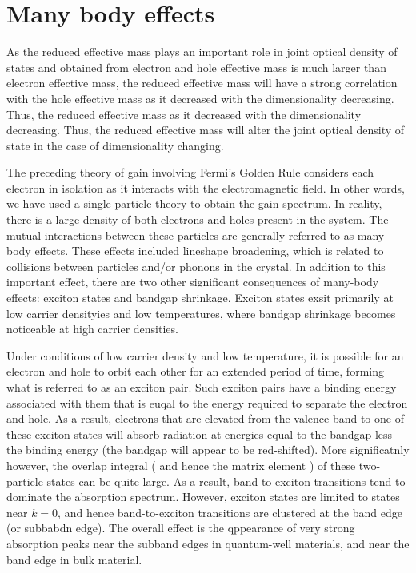 \section{Many body effects}

As the reduced effective mass plays an important role in joint optical density
of states and obtained from electron and hole effective mass is much larger
than electron effective mass, the reduced effective mass will have a strong
correlation with the hole effective mass as it decreased with the
dimensionality decreasing. Thus, the reduced effective mass as it decreased
with the dimensionality decreasing. Thus, the reduced effective mass will alter
the joint optical density of state in the case of dimensionality changing.

The preceding theory of gain involving Fermi's Golden Rule considers each
electron in isolation as it interacts with the electromagnetic field. In other
words, we have used a single-particle theory to obtain the gain spectrum. In
reality, there is a large density of both electrons and holes present in the
system. The mutual interactions between these particles are generally referred
to as many-body effects. These effects included lineshape broadening, which is
related to collisions between particles and/or phonons in the crystal. In
addition to this important effect, there are two other significant consequences
of many-body effects: exciton states and bandgap shrinkage. Exciton states
exsit primarily at low carrier densityies and low temperatures, where bandgap
shrinkage becomes noticeable at high carrier densities.

Under conditions of low carrier density and low temperature, it is possible for
an electron and hole to orbit each other for an extended period of time,
forming what is referred to as an exciton pair. Such exciton pairs have a
binding energy associated with them that is euqal to the energy required to
separate the electron and hole. As a result, electrons that are elevated from
the valence band to one of these exciton states will absorb radiation at
energies equal to the bandgap less the binding energy (the bandgap will appear
to be red-shifted). More significatnly however, the overlap integral ( and
hence the matrix element ) of these two-particle states can be quite large. As
a result, band-to-exciton transitions tend to dominate the absorption spectrum.
However, exciton states are limited to states near $k = 0$, and hence
band-to-exciton transitions are clustered at the band edge (or subbabdn edge).
The overall effect is the qppearance of very strong absorption peaks near the
subband edges in quantum-well materials, and near the band edge in bulk
material.


